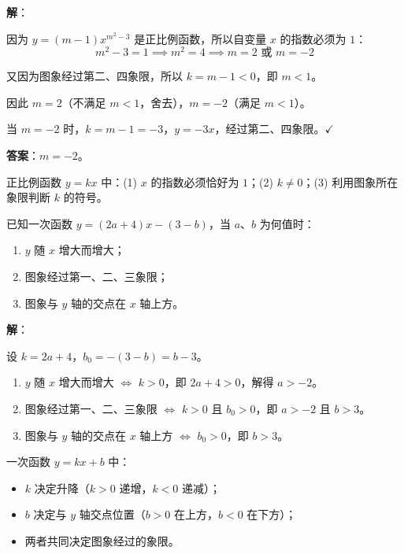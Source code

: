 \documentclass[12pt, a4paper]{ctexart}
\begin{document}
\textbf{解}：

因为 $y = (m-1)x^{m^2-3}$ 是正比例函数，所以自变量 $x$ 的指数必须为 $1$：
$$m^2 - 3 = 1 \implies m^2 = 4 \implies m = 2 \text{ 或 } m = -2$$

又因为图象经过第二、四象限，所以 $k = m - 1 < 0$，即 $m < 1$。

因此 $m = 2$（不满足 $m<1$，舍去），$m = -2$（满足 $m < 1$）。

当 $m = -2$ 时，$k = m - 1 = -3$，$y = -3x$，经过第二、四象限。$\checkmark$

\textbf{答案}：$m = -2$。

\begin{tipbox}[方法总结]
正比例函数 $y = kx$ 中：(1) $x$ 的指数必须恰好为 $1$；(2) $k \neq 0$；(3) 利用图象所在象限判断 $k$ 的符号。
\end{tipbox}

\begin{examplebox}[【例题3】一次函数图象过象限问题]
已知一次函数 $y = (2a+4)x - (3-b)$，当 $a$、$b$ 为何值时：
\begin{enumerate}[leftmargin=2em]
  \item $y$ 随 $x$ 增大而增大；
  \item 图象经过第一、二、三象限；
  \item 图象与 $y$ 轴的交点在 $x$ 轴上方。
\end{enumerate}
\end{examplebox}

\textbf{解}：

设 $k = 2a + 4$，$b_0 = -(3-b) = b - 3$。

\begin{enumerate}[leftmargin=2em]
  \item $y$ 随 $x$ 增大而增大 $\Longleftrightarrow$ $k > 0$，即 $2a + 4 > 0$，解得 $a > -2$。
  \item 图象经过第一、二、三象限 $\Longleftrightarrow$ $k > 0$ 且 $b_0 > 0$，即 $a > -2$ 且 $b > 3$。
  \item 图象与 $y$ 轴的交点在 $x$ 轴上方 $\Longleftrightarrow$ $b_0 > 0$，即 $b > 3$。
\end{enumerate}

\begin{tipbox}[方法总结]
一次函数 $y = kx + b$ 中：
\begin{itemize}[leftmargin=2em]
  \item $k$ 决定升降（$k>0$ 递增，$k<0$ 递减）；
  \item $b$ 决定与 $y$ 轴交点位置（$b>0$ 在上方，$b<0$ 在下方）；
  \item 两者共同决定图象经过的象限。
\end{itemize}
\end{tipbox}
\end{document}

